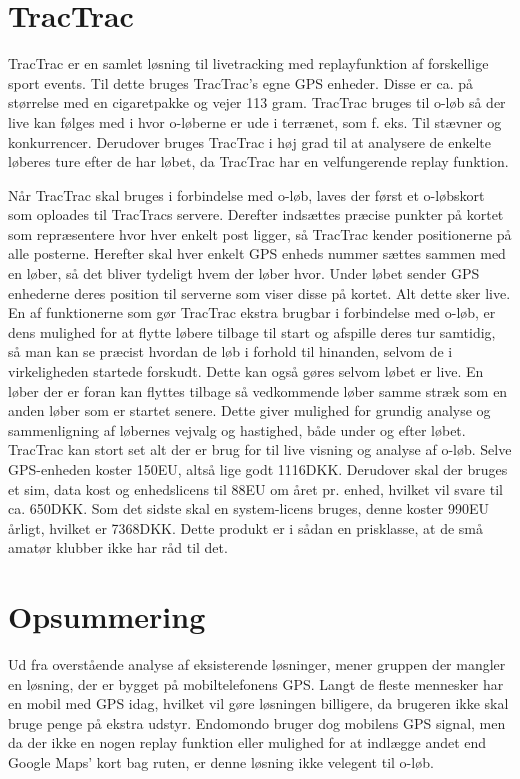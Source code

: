 \section{TracTrac}
TracTrac er en samlet løsning til livetracking med replayfunktion af forskellige sport events. Til dette bruges TracTrac's egne GPS enheder. Disse er ca. på størrelse med en cigaretpakke og vejer 113 gram.\newline
TracTrac bruges til o-løb så der live kan følges med i hvor o-løberne er ude i terrænet, som f. eks. Til stævner og konkurrencer. Derudover bruges TracTrac i høj grad til at analysere de enkelte løberes ture efter de har løbet, da TracTrac har en velfungerende replay funktion. 

Når TracTrac skal bruges i forbindelse med o-løb, laves der først et o-løbskort som oploades til TracTracs servere. Derefter indsættes præcise punkter på kortet som repræsentere hvor hver enkelt post ligger, så TracTrac kender positionerne på alle posterne. Herefter skal hver enkelt GPS enheds nummer sættes sammen med en løber, så det bliver tydeligt hvem der løber hvor. Under løbet sender GPS enhederne deres position til serverne som viser disse på kortet. Alt dette sker live. En af funktionerne som gør TracTrac ekstra brugbar i forbindelse med o-løb, er dens mulighed for at flytte løbere tilbage til start og afspille deres tur samtidig, så man kan se præcist hvordan de løb i forhold til hinanden, selvom de i virkeligheden startede forskudt. Dette kan også gøres selvom løbet er live. En løber der er foran kan flyttes tilbage så vedkommende løber samme stræk som en anden løber som er startet senere. Dette giver mulighed for grundig analyse og sammenligning af løbernes vejvalg og hastighed, både under og efter løbet.\newline
TracTrac kan stort set alt der er brug for til live visning og analyse af o-løb. Selve GPS-enheden koster 150EU, altså lige godt 1116DKK. Derudover skal der bruges et sim, data kost og enhedslicens til 88EU om året pr. enhed, hvilket vil svare til ca. 650DKK. Som det sidste skal en system-licens bruges, denne koster 990EU årligt, hvilket er 7368DKK. Dette produkt er i sådan en prisklasse, at de små amatør klubber ikke har råd til det. \citep{TTC}


\section{Opsummering}
Ud fra overstående analyse af eksisterende løsninger, mener gruppen der mangler en løsning, der er bygget på mobiltelefonens GPS. Langt de fleste mennesker har en mobil med GPS idag, hvilket vil gøre løsningen billigere, da brugeren ikke skal bruge penge på ekstra udstyr. Endomondo bruger dog mobilens GPS signal, men da der ikke en nogen replay funktion eller mulighed for at indlægge andet end Google Maps' kort bag ruten, er denne løsning ikke velegent til o-løb. 
